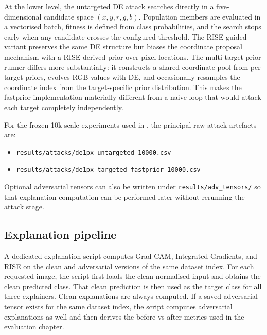 At the lower level, the untargeted DE attack searches directly in a five-dimensional candidate
space $(x,y,r,g,b)$. Population members are evaluated in a vectorised batch, fitness is defined
from class probabilities, and the search stops early when any candidate crosses the configured
threshold. The RISE-guided variant preserves the same DE structure but biases the coordinate
proposal mechanism with a RISE-derived prior over pixel locations. The multi-target prior
runner differs more substantially: it constructs a shared coordinate pool from per-target
priors, evolves RGB values with DE, and occasionally resamples the coordinate index from the
target-specific prior distribution. This makes the fastprior implementation materially different
from a naive loop that would attack each target completely independently.

For the frozen 10k-scale experiments used in , the principal raw attack
artefacts are:
\begin{itemize}
  \item \texttt{results/attacks/de1px\_untargeted\_10000.csv}
  \item \texttt{results/attacks/de1px\_targeted\_fastprior\_10000.csv}
\end{itemize}
Optional adversarial tensors can also be written under \texttt{results/adv\_tensors/} so that
explanation computation can be performed later without rerunning the attack stage.

\subsection{Explanation pipeline}
A dedicated explanation script computes Grad-CAM, Integrated Gradients, and RISE on the clean
and adversarial versions of the same dataset index. For each requested image, the script first
loads the clean normalised input and obtains the clean predicted class. That clean prediction is
then used as the target class for all three explainers. Clean explanations are always computed.
If a saved adversarial tensor exists for the same dataset index, the script computes
adversarial explanations as well and then derives the before-vs-after metrics used in the
evaluation chapter.

